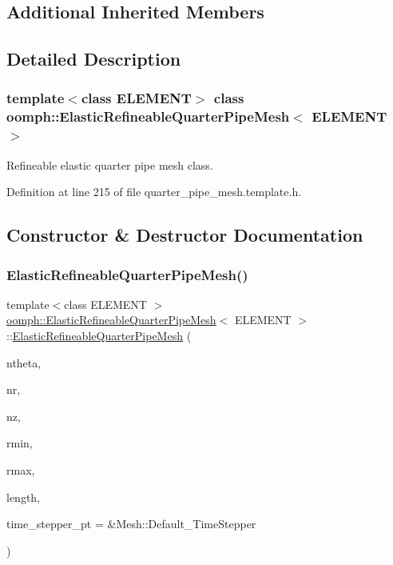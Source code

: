 \subsection*{Additional Inherited Members}


\subsection{Detailed Description}
\subsubsection*{template$<$class E\+L\+E\+M\+E\+NT$>$\newline
class oomph\+::\+Elastic\+Refineable\+Quarter\+Pipe\+Mesh$<$ E\+L\+E\+M\+E\+N\+T $>$}

Refineable elastic quarter pipe mesh class. 

Definition at line 215 of file quarter\+\_\+pipe\+\_\+mesh.\+template.\+h.



\subsection{Constructor \& Destructor Documentation}
\mbox{\label{classoomph_1_1ElasticRefineableQuarterPipeMesh_a5d90778b3a060b97353b5d9ff5a9dd3d}} 
\subsubsection{\texorpdfstring{Elastic\+Refineable\+Quarter\+Pipe\+Mesh()}{ElasticRefineableQuarterPipeMesh()}}
{\footnotesize\ttfamily template$<$class E\+L\+E\+M\+E\+NT $>$ \\
\hyperlink{classoomph_1_1ElasticRefineableQuarterPipeMesh}{oomph\+::\+Elastic\+Refineable\+Quarter\+Pipe\+Mesh}$<$ E\+L\+E\+M\+E\+NT $>$\+::\hyperlink{classoomph_1_1ElasticRefineableQuarterPipeMesh}{Elastic\+Refineable\+Quarter\+Pipe\+Mesh} (\begin{DoxyParamCaption}\item[{const unsigned \&}]{ntheta,  }\item[{const unsigned \&}]{nr,  }\item[{const unsigned \&}]{nz,  }\item[{const double \&}]{rmin,  }\item[{const double \&}]{rmax,  }\item[{const double \&}]{length,  }\item[{Time\+Stepper $\ast$}]{time\+\_\+stepper\+\_\+pt = {\ttfamily \&Mesh\+:\+:Default\+\_\+TimeStepper} }\end{DoxyParamCaption})\hspace{0.3cm}{\ttfamily [inline]}}



